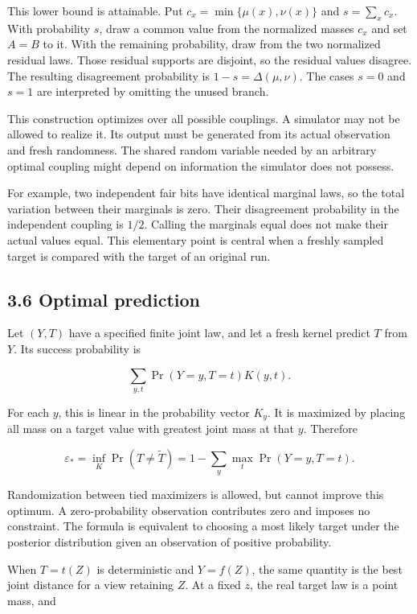 \documentclass[
]{article}
\begin{document}
This lower bound is attainable. Put \(c_x=\min\{\mu(x),\nu(x)\}\) and
\(s=\sum_xc_x\). With probability \(s\), draw a common value from the
normalized masses \(c_x\) and set \(A=B\) to it. With the remaining
probability, draw from the two normalized residual laws. Those residual
supports are disjoint, so the residual values disagree. The resulting
disagreement probability is \(1-s=\Delta(\mu,\nu)\). The cases \(s=0\)
and \(s=1\) are interpreted by omitting the unused branch.

This construction optimizes over all possible couplings. A simulator may
not be allowed to realize it. Its output must be generated from its
actual observation and fresh randomness. The shared random variable
needed by an arbitrary optimal coupling might depend on information the
simulator does not possess.

For example, two independent fair bits have identical marginal laws, so
the total variation between their marginals is zero. Their disagreement
probability in the independent coupling is \(1/2\). Calling the
marginals equal does not make their actual values equal. This elementary
point is central when a freshly sampled target is compared with the
target of an original run.

\subsection{3.6 Optimal prediction}\label{optimal-prediction}

Let \((Y,T)\) have a specified finite joint law, and let a fresh kernel
predict \(T\) from \(Y\). Its success probability is

\[
\sum_{y,t}\Pr(Y=y,T=t)K(y,t).
\]

For each \(y\), this is linear in the probability vector \(K_y\). It is
maximized by placing all mass on a target value with greatest joint mass
at that \(y\). Therefore

\[
\varepsilon_*=\inf_K\Pr(T\ne\widetilde T)
=1-\sum_y\max_t\Pr(Y=y,T=t).
\]

Randomization between tied maximizers is allowed, but cannot improve
this optimum. A zero-probability observation contributes zero and
imposes no constraint. The formula is equivalent to choosing a most
likely target under the posterior distribution given an observation of
positive probability.

When \(T=t(Z)\) is deterministic and \(Y=f(Z)\), the same quantity is
the best joint distance for a view retaining \(Z\). At a fixed \(z\),
the real target law is a point mass, and
\end{document}
